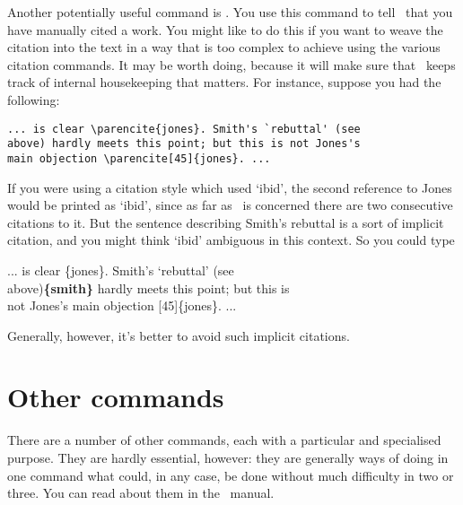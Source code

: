 Another potentially useful command is . You use this
command to tell \biblatex\ that you have manually cited a work. You
might like to do this if you want to weave the citation into the text
in a way that is too complex to achieve using the various citation
commands. It may be worth doing, because it will make sure that
\biblatex\ keeps track of internal housekeeping that matters. For
instance, suppose you had the following:
\begin{verbatim}
... is clear \parencite{jones}. Smith's `rebuttal' (see 
above) hardly meets this point; but this is not Jones's 
main objection \parencite[45]{jones}. ...
\end{verbatim}
If you were using a citation style which used `ibid', the second
reference to Jones would be printed as `ibid', since as far as
\biblatex\ is concerned there are two consecutive citations to it. But
the sentence describing Smith's rebuttal is a sort of implicit
citation, and you might think `ibid' ambiguous in this context. So you
could type
\begin{pseudoverb}
... is clear \{jones\}. Smith's `rebuttal' (see\\
above){\bfseries{}\{smith\}} hardly meets this point; but this is\\
not Jones's main objection [45]\{jones\}. ...
\end{pseudoverb}
Generally, however, it's better to avoid such implicit citations.

\section{Other commands}

There are a number of other commands, each with a particular and
specialised purpose. They are hardly essential, however: they are
generally ways of doing in one command what could, in any case, be
done without much difficulty in two or three. You can read about them
in the \biblatex\ manual.